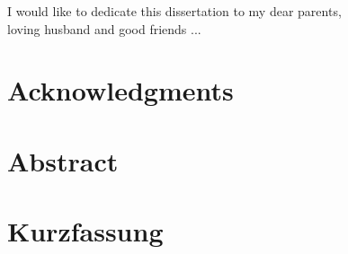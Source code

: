 \documentclass[12pt,twoside]{report}
\renewcommand{\_}{%
  \textunderscore\hspace{0pt}%
}
\begin{document}
\renewcommand{\labelitemii}{$\bullet$}

\clearpage
\pagestyle{empty}
\vspace*{\fill}
\begin{center}
\begin{minipage}{.8\textwidth}
I would like to dedicate this dissertation to my dear parents,\\ loving husband and good friends ...
\end{minipage}
\end{center}
\vfill %
\clearpage
{}
\thispagestyle{empty}
\chapter*{Acknowledgments}

\chapter*{Abstract}

\chapter*{Kurzfassung}

\pagestyle{fancy}
\thispagestyle{empty}
\tableofcontents



\clearpage
\end{document}
